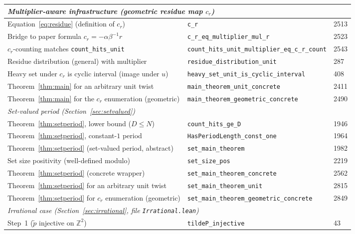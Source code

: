 \documentclass[11pt,reqno]{amsart}
\theoremstyle{plain}
\theoremstyle{definition}
\theoremstyle{remark}
\begin{document}
\begin{table}[ht]
\begin{tabular}{lll}
\hline
\multicolumn{3}{l}{\textit{Multiplier-aware infrastructure (geometric residue map \(c_r\))}} \\
\hline
Equation~\eqref{eq:residue} (definition of \(c_r\))
  & \texttt{c\_r} & 2513 \\
Bridge to paper formula \(c_r = -\alpha\beta^{-1}r\)
  & \texttt{c\_r\_eq\_multiplier\_mul\_r} & 2523 \\
\(c_r\)-counting matches \texttt{count\_hits\_unit}
  & \texttt{count\_hits\_unit\_multiplier\_eq\_c\_r\_count} & 2543 \\
Residue distribution (general) with multiplier
  & \texttt{residue\_distribution\_unit} & 287 \\
Heavy set under \(c_r\) is cyclic interval (image under \(u\))
  & \texttt{heavy\_set\_unit\_is\_cyclic\_interval} & 408 \\
Theorem~\ref{thm:main} for an arbitrary unit twist
  & \texttt{main\_theorem\_unit\_concrete} & 2411 \\
Theorem~\ref{thm:main} for the \(c_r\) enumeration (geometric)
  & \texttt{main\_theorem\_geometric\_concrete} & 2490 \\
\hline
\multicolumn{3}{l}{\textit{Set-valued period (Section~\ref{sec:setvalued})}} \\
\hline
Theorem~\ref{thm:setperiod}, lower bound (\(D \le N\))
  & \texttt{count\_hits\_ge\_D} & 1946 \\
Theorem~\ref{thm:setperiod}, constant-\(1\) period
  & \texttt{HasPeriodLength\_const\_one} & 1964 \\
Theorem~\ref{thm:setperiod} (set-valued period, abstract)
  & \texttt{set\_main\_theorem} & 1982 \\
Set size positivity (well-defined modulo)
  & \texttt{set\_size\_pos} & 2219 \\
Theorem~\ref{thm:setperiod} (concrete wrapper)
  & \texttt{set\_main\_theorem\_concrete} & 2562 \\
Theorem~\ref{thm:setperiod} for an arbitrary unit twist
  & \texttt{set\_main\_theorem\_unit} & 2815 \\
Theorem~\ref{thm:setperiod} for \(c_r\) enumeration (geometric)
  & \texttt{set\_main\_theorem\_geometric\_concrete} & 2849 \\
\hline
\multicolumn{3}{l}{\textit{Irrational case (Section~\ref{sec:irrational}, file \texttt{Irrational.lean})}} \\
\hline
Step~1 (\(\tilde p\) injective on \(\mathbb{Z}^2\))
  & \texttt{tildeP\_injective} & 43 \\

\end{tabular}
\end{table}
\end{document}

